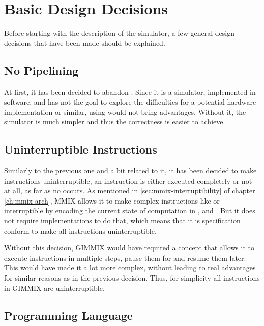 \section{Basic Design Decisions}

Before starting with the description of the simulator, a few general design decisions that have been made should be explained.

\subsection{No Pipelining}

At first, it has been decided to abandon . Since it is a simulator, \ie implemented in software, and has not the goal to explore the difficulties for a potential hardware  implementation or similar, using  would not bring advantages. Without it, the simulator is much simpler and thus the correctness is easier to achieve.

\subsection{Uninterruptible Instructions}

Similarly to the previous one and a bit related to it, it has been decided to make instructions uninterruptible, \ie an instruction is either executed completely or not at all, as far as no  occurs. As mentioned in \ref{sec:mmix-interruptibility} of chapter \ref{ch:mmix-arch}, MMIX allows it to make complex instructions like  or  interruptible by encoding the current state of computation in ,  and . But it does not require implementations to do that, which means that it is specification conform to make all instructions uninterruptible. \citep[pg. 27]{mmix-doc}

Without this decision, GIMMIX would have required a concept that allows it to execute instructions in multiple steps, pause them for  and resume them later. This would have made it a lot more complex, without leading to real advantages for similar reasons as in the previous decision. Thus, for simplicity all instructions in GIMMIX are uninterruptible.

\subsection{Programming Language}

